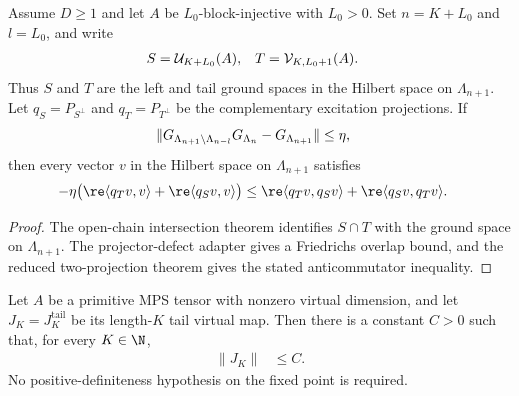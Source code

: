 \begin{lemma}
    \label{thm:nachtergaele_open_chain_projector_defect}
    \leanok
    Assume $D\ge1$ and let $A$ be $L_0$-block-injective with $L_0>0$. Set
    $n=K+L_0$ and $l=L_0$, and write
    \begin{align}
        S & =\mathcal U_{K+L_0}(A),          &
        T & =\mathcal V_{K,L_0+1}(A). \notag
    \end{align}
    Thus $S$ and $T$ are the left and tail ground spaces in the Hilbert space
    on $\Lambda_{n+1}$. Let $q_S=P_{S^\perp}$ and $q_T=P_{T^\perp}$ be the
    complementary excitation projections. If
    \begin{align}
        \|G_{\Lambda_{n+1}\setminus\Lambda_{n-l}}G_{\Lambda_n}
        -G_{\Lambda_{n+1}}\| & \le\eta, \notag
    \end{align}
    then every vector $v$ in the Hilbert space on $\Lambda_{n+1}$ satisfies
    \begin{align}
        -\eta\bigl(
        \re\langle q_Tv,v\rangle+\re\langle q_Sv,v\rangle\bigr)
         & \le
        \re\langle q_Tv,q_Sv\rangle+\re\langle q_Sv,q_Tv\rangle. \notag
    \end{align}
\end{lemma}

\begin{proof}
    \leanok
    The open-chain intersection theorem identifies $S\cap T$ with the ground
    space on $\Lambda_{n+1}$. The projector-defect adapter gives a Friedrichs
    overlap bound, and the reduced two-projection theorem gives the stated
    anticommutator inequality.
\end{proof}

\begin{lemma}
    \label{thm:primitive_tail_virtual_map_norm_uniform}
    \leanok
    Let $A$ be a primitive MPS tensor with nonzero virtual dimension, and let
    $J_K=J^{\mathrm{tail}}_K$ be its length-$K$ tail virtual map.  Then there is
    a constant $C>0$ such that, for every $K\in\N$,
    \begin{align}
        \lVert J_K\rVert & \leq C.
    \end{align}
    No positive-definiteness hypothesis on the fixed point is required.
\end{lemma}

